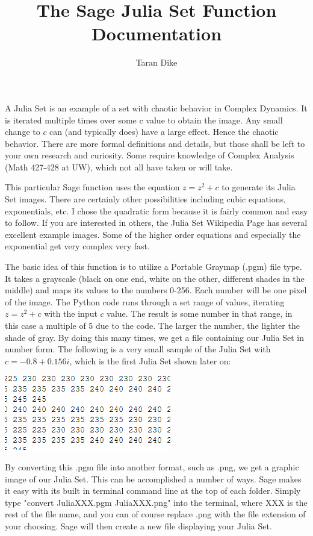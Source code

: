 \documentclass{article}
\title{The Sage Julia Set Function Documentation}
\author{Taran Dike}
\begin{document}
\maketitle

\clearpage
A Julia Set is an example of a set with chaotic behavior in Complex Dynamics.  It is iterated multiple times over some c value to obtain the image.  Any small change to $c$ can (and typically does) have a large effect.  Hence the chaotic behavior. There are more formal definitions and details, but those shall be left to your own research and curiosity.  Some require knowledge of  Complex Analysis (Math 427-428 at UW), which not all have taken or will take.

This particular Sage function uses the equation $z = z^2 + c$ to generate its Julia Set images.  There are certainly other possibilities including cubic equations, exponentials, etc.  I chose the quadratic form because it is fairly common and easy to follow.  If you are interested in others, the Julia Set Wikipedia Page has several excellent example images.  Some of the higher order equations and especially the exponential get very complex very fast.

The basic idea of this function is to utilize a Portable Graymap (.pgm) file type.  It takes a grayscale (black on one end, white on the other, different shades in the middle) and maps its values to the numbers 0-256.  Each number will be one pixel of the image.  The Python code runs through a set range of values, iterating $z = z^2 + c$ with the input $c$ value.  The result is some number in that range, in this case a multiple of 5 due to the code.  The larger the number, the lighter the shade of gray.  By doing this many times, we get a file containing our Julia Set in number form.  The following is a very small sample of the Julia Set with $c = -0.8 + 0.156i$, which is the first Julia Set shown later on:

\begin{center}
\includegraphics{JuliaPGMScreenshot}
\end{center}

By converting this .pgm file into another format, such as .png, we get a graphic image of our Julia Set.  This can be accomplished a number of ways.  Sage makes it easy with its built in terminal command line at the top of each folder.  Simply type "convert JuliaXXX.pgm JuliaXXX.png" into the terminal, where XXX is the rest of the file name, and you can of course replace .png with the file extension of your choosing.  Sage will then create a new file displaying your Julia Set.
\end{document}
